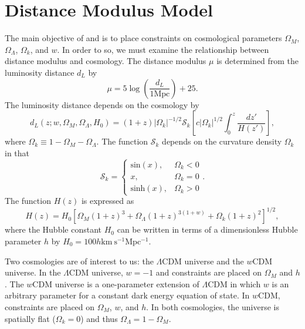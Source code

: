 \documentclass[12pt,a4paper]{article}
\begin{document}
\section{Distance Modulus Model}
\label{sec:model}
The main objective of \citet{betoule2014} and \citet{rest2014} is 
to place constraints on cosmological parameters $\Omega_M$, $\Omega_\Lambda$, 
$\Omega_k$, and $w$. In order to so, we must examine the relationship between distance 
modulus and cosmology. The distance modulus $\mu$ is determined from 
the luminosity distance $d_L$ by 
%
\begin{equation}
  \label{eq:mu_dL}
  \mu=5 \log\left(\frac{d_L}{1 \mathrm{Mpc}}\right)+25. 
\end{equation}
%
The luminosity distance depends on the cosmology by 
%
\begin{equation}
\label{eq:luminosityDistance}
d_L(z; w, \Omega_M, \Omega_\Lambda, H_0)= (1+z)|\Omega_k|^{-1/2}\mathcal{S}_{k}\displaystyle\left[c|\Omega_k|^{1/2}\int_{0}^{z}\frac{dz'}{H(z')}\right],
\end{equation}
%
where $\Omega_k \equiv 1-\Omega_M-\Omega_{\Lambda}$. The function 
$\mathcal{S}_{k}$ depends on the curvature density $\Omega_k$ in that 
\[
    \mathcal{S}_{k}= 
\begin{cases}
    \text{sin}(x),&  \Omega_k < 0\\
    x,& \Omega_k = 0\\
    \text{sinh}(x),& \Omega_k > 0
\end{cases}.
\]
The function $H(z)$ is expressed as 
%
\begin{equation}
  \label{eq:hubbleFunction}
  H(z)= H_0\displaystyle\left[\Omega_M(1+z)^3+\Omega_{\Lambda}(1+z)^{3(1+w)}+\Omega_k(1+z)^2\right]^{1/2},
\end{equation}
%
where the Hubble constant $H_0$ can be written in terms of a 
dimensionless Hubble parameter $h$ by $H_0=100h \mathrm{km\ s^{-1}Mpc^{-1}}$.

Two cosmologies are of interest to us: the  $\Lambda$CDM 
universe and the $w$CDM universe. In the  $\Lambda$CDM 
universe, $w=-1$ and constraints are placed on $\Omega_M$ and $h$. 
The $w$CDM universe is a one-parameter extension of  $\Lambda$CDM 
in which $w$ is an arbitrary parameter for a constant dark energy 
equation of state. In $w$CDM, constraints are placed on $\Omega_M$, $w$, 
and $h$. In both cosmologies, the universe is spatially flat 
($\Omega_k = 0$) and thus $\Omega_{\Lambda}=1-\Omega_M$. 
\end{document}
